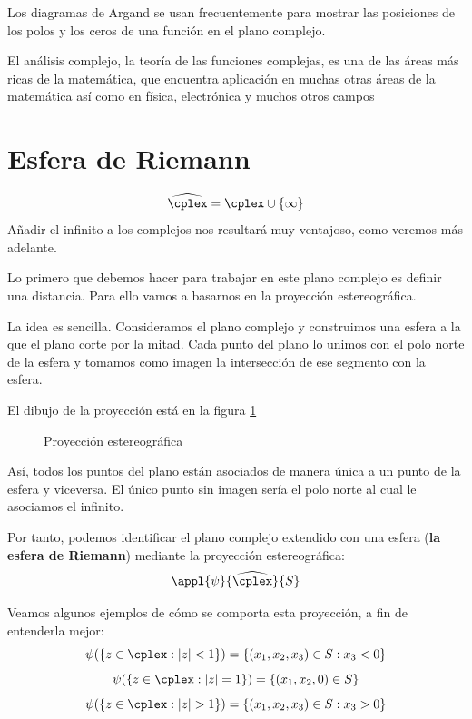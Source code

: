 \documentclass{apuntes}
\begin{document}
Los diagramas de Argand se usan frecuentemente para mostrar las posiciones de los polos y los ceros de una función en el plano complejo.

El análisis complejo, la teoría de las funciones complejas, es una de las áreas más ricas de la matemática, que encuentra aplicación en muchas otras áreas de la matemática así como en física, electrónica y muchos otros campos

\section{Esfera de Riemann}
\begin{defn}
\[\widehat{\cplex}=\cplex \cup \{\infty\}\]
Añadir el infinito a los complejos nos resultará muy ventajoso, como veremos más adelante.
\end{defn}

Lo primero que debemos hacer para trabajar en este plano complejo es definir una distancia. Para ello vamos a basarnos en la proyección estereográfica.

La idea es sencilla. Consideramos el plano complejo y construimos una esfera a la que el plano corte por la mitad. Cada punto del plano lo unimos con el polo norte de la esfera y tomamos como imagen la intersección de ese segmento con la esfera.

El dibujo de la proyección está en la figura \ref{figProyeccionEstereografica}

\begin{figure}[hbtp]
\centering

\caption{Proyección estereográfica}
\label{figProyeccionEstereografica}
\end{figure}

Así, todos los puntos del plano están asociados de manera única a un punto de la esfera y viceversa. El único punto sin imagen sería el polo norte al cual le asociamos el infinito.

Por tanto, podemos identificar el plano complejo extendido con una esfera (\textbf{la esfera de Riemann}) mediante la proyección estereográfica:
\[\appl{\psi}{\widehat{\cplex}}{S}\]

\begin{example}
Veamos algunos ejemplos de cómo se comporta esta proyección, a fin de entenderla mejor:
\[\psi(\{z \in \cplex : |z|<1\})=\{(x_1,x_2,x_3) \in S: x_3<0\}\]
\[\psi(\{z \in \cplex : |z|=1\})=\{(x_1,x_2,0)\in S\}\]
\[\psi(\{z \in \cplex : |z|>1\})=\{(x_1,x_2,x_3) \in S: x_3>0\}\]
\end{example}
\end{document}
